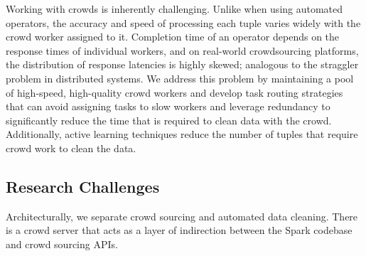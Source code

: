 
Working with crowds is inherently challenging.
Unlike when using automated operators, the accuracy and speed of processing each tuple varies widely with the crowd worker assigned to it.
Completion time of an operator depends on the response times of individual workers, and on real-world crowdsourcing 
platforms, the distribution of response latencies is highly skewed; analogous to the straggler problem in distributed systems.
We address this problem by maintaining a pool of high-speed, high-quality crowd workers and develop task routing strategies 
that can avoid assigning tasks to slow workers and leverage redundancy to significantly reduce the time that is required to clean 
data with the crowd. 
Additionally, active learning techniques reduce the number of tuples that require crowd work to clean the data.

\vspace{-0.25cm}


\iffalse
\subsection{Research Challenges}

Architecturally, we separate crowd sourcing and automated data cleaning.
There is a crowd server that acts as a layer of indirection between the Spark codebase and crowd sourcing APIs.


